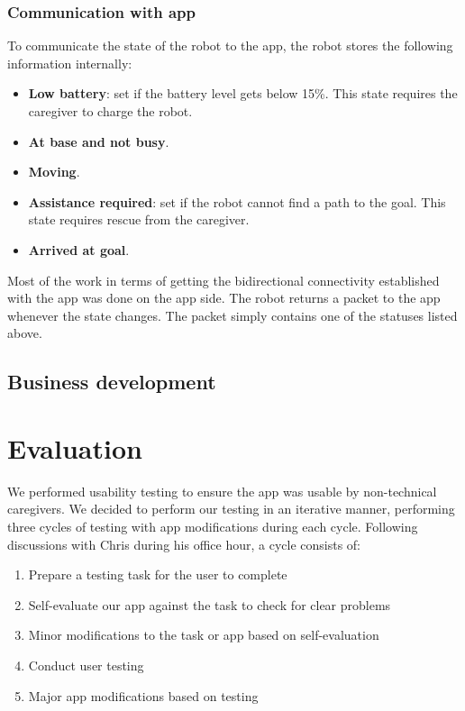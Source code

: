 \documentclass{article}
\begin{document}
\subsubsection{Communication with app}
To communicate the state of the robot to the app, the robot stores the following information internally:
\begin{itemize}
\item {\bf Low battery}: set if the battery level gets below 15\%. This state requires the caregiver to charge the robot. 
\item {\bf At base and not busy}. 
\item {\bf Moving}.
\item {\bf Assistance required}: set if the robot cannot find a path to the goal. This state requires rescue from the caregiver. 
\item {\bf Arrived at goal}.
\end{itemize}

Most of the work in terms of getting the bidirectional connectivity established with the app was done on the app side. The robot returns a packet to the app whenever the state changes. The packet simply contains one of the statuses listed above.

\subsection{Business development}

\section{Evaluation}
We performed usability testing to ensure the app was usable by non-technical caregivers. We decided to perform our testing in an iterative manner, performing three cycles of testing with app modifications during each cycle. Following discussions with Chris during his office hour, a cycle consists of:
\begin{enumerate}
  \item Prepare a testing task for the user to complete
  \item Self-evaluate our app against the task to check for clear problems
  \item Minor modifications to the task or app based on self-evaluation
  \item Conduct user testing
  \item Major app modifications based on testing
\end{enumerate}
\end{document}
